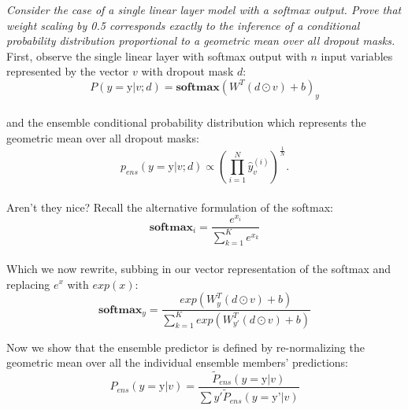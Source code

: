 \documentclass{amsart}
\theoremstyle{definition}
\theoremstyle{remark}
\numberwithin{equation}{section}
\begin{document}
\textit{Consider the case of a single linear layer model with a softmax output.
Prove that weight scaling by 0.5 corresponds exactly to the inference of a
conditional probability distribution proportional to a geometric mean over all
dropout masks.} \\

First, observe the single linear layer with softmax output with $n$ input
variables represented by the vector $v$ with dropout mask $d$: \\

\begin{equation}
P(y = \mbox{y} | v;d ) = \mathbf{softmax}\left( W^T(d \odot v) + b \right)_y
\end{equation} \\

and the ensemble conditional probability distribution which represents the
geometric mean over all dropout masks: \\

\begin{equation}
p_{ens}(y = \mbox{y} | v;d ) \propto \left( \prod_{i=1}^N \hat{y}_{v}^{(i)} \right)^{\frac{1}{N}}.
\end{equation} \\

Aren't they nice? Recall the alternative formulation of the softmax: \\

\begin{equation}
\mathbf{softmax}_i = \frac{e^{x_i}}{\sum_{k=1}^K e^{x_k}}
\end{equation} \\

Which we now rewrite, subbing in our vector representation of the softmax and
replacing $e^x$ with $exp(x)$: \\

\begin{equation}
\mathbf{softmax}_y = \frac{exp \left( W_y^T(d \odot v) + b \right)}
                          {\sum_{k=1}^K exp \left( W_{y'}^T(d \odot v) + b \right)}
\end{equation}

Now we show that the ensemble predictor is defined by re-normalizing the
geometric mean over all the individual ensemble members' predictions: \\

\begin{equation}
P_{ens}(y = \mbox{y} | v) = \frac{\tilde{P}_{ens}(y = \mbox{y} | v)}{\sum{y'} \tilde{P}_{ens}(y = \mbox{y'} | v)}
\end{equation} \\
\end{document}
